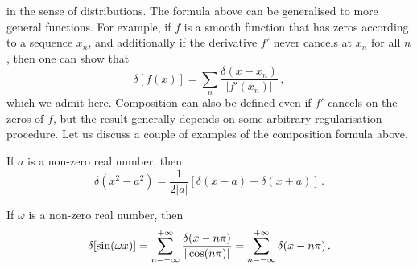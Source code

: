 in the sense of distributions. The formula above can be generalised to more general
functions. For example, if $f$ is a smooth function that has zeros according to a sequence
$x_n$, and additionally if the derivative $f'$ never cancels at $x_n$ for all $n$, then
one can show that
\begin{equation}
  \delta[f(x)]=\sum_n\frac{\delta(x-x_n)}{|f'(x_n)|}\,,
\end{equation}
which we admit here. Composition can also be defined even if $f'$ cancels on the zeros of
$f$, but the result generally depends on some arbitrary regularisation procedure. Let us
discuss a couple of examples of the composition formula above.
\begin{example}
  If $a$ is a non-zero real number, then
  \begin{equation}
    \delta(x^2-a^2)=\frac{1}{2|a|}[\delta(x-a)+\delta(x+a)]\,.
  \end{equation}
\end{example}
\begin{example}
  If $\omega$ is a non-zero real number, then
  \begin{equation}
    \delta[\sin(\omega x)]=\sum_{n=-\infty}^{+\infty}\frac{\delta(x-n\pi)}{|\cos(n\pi)|}=\sum_{n=-\infty}^{+\infty}\delta(x-n\pi)\,.
  \end{equation}
\end{example}
